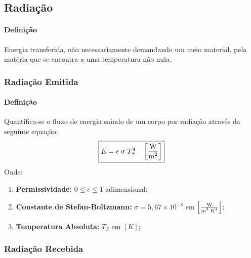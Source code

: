\documentclass{article}
\begin{document}
        \subsection{Radiação}
            \paragraph{Definição}Energia transferida, não necessariamente demandando um meio material, pela matéria que se encontra a uma temperatura não nula. 

        \subsubsection{Radiação Emitida}
            \paragraph{Definição}Quantifica-se o fluxo de energia saindo de um corpo por radiação através da seguinte equação:
                \begin{equation}
                    \boxed{
                        E = \epsilon\;\sigma\;T_{S}^{4}
                        \quad
                        \left[\frac{\text{W}}{\text{m\textsuperscript{2}}}\right]
                    }
                \end{equation}
            Onde:
                \begin{enumerate}[noitemsep]
                    \item \textbf{Permissividade:} $0 \leq \epsilon \leq 1$ adimensional;
                    \item \textbf{Constante de Stefan-Boltzmann:} $\sigma = 5,67\times 10^{-8}$ em $\left[\frac{\text{W}}{\text{m\textsuperscript{2} K\textsuperscript{4}}}\right]$;
                    \item \textbf{Temperatura Absoluta:} $T_{S}$ em $[K]$;
                \end{enumerate}

        \subsubsection{Radiação Recebida}
\end{document}
